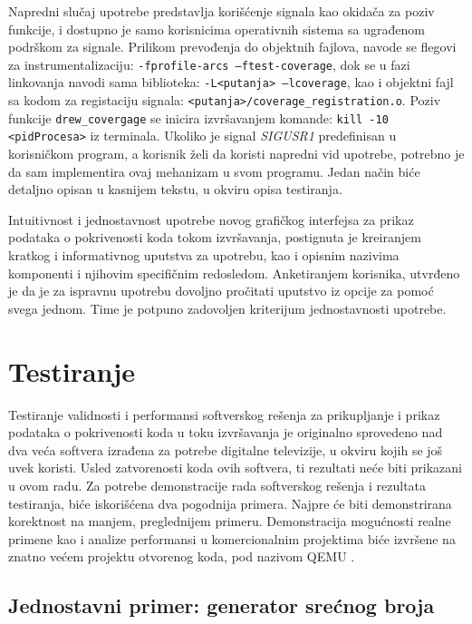 \documentclass[12pt,oneside]{memoir}
\newcommand{\kod}[1]{\texttt{#1}}
\newcommand{\strano}[1]{\textit{#1}}
\begin{document}
Napredni slučaj upotrebe predstavlja korišćenje signala kao okidača za poziv funkcije, i dostupno je samo korisnicima operativnih sistema sa ugrađenom podrškom za signale. Prilikom prevođenja do objektnih fajlova, navode se flegovi za instrumentalizaciju: \kod{-fprofile-arcs –ftest-coverage}, dok se u fazi linkovanja navodi sama biblioteka: \kod{-L<putanja> –lcoverage}, kao i objektni fajl sa kodom za registaciju signala: \kod{<putanja>/coverage\_registration.o}. Poziv funkcije \kod{drew\_covergage} se inicira izvršavanjem komande: \kod{kill -10 <pidProcesa>} iz terminala. Ukoliko je signal \strano{SIGUSR1} predefinisan u korisničkom program, a korisnik želi da koristi napredni vid upotrebe, potrebno je da sam implementira ovaj mehanizam u svom programu. Jedan način biće detaljno opisan u kasnijem tekstu, u okviru opisa testiranja. 

Intuitivnost i jednostavnost upotrebe novog grafičkog interfejsa za prikaz podataka o pokrivenosti koda tokom izvršavanja, postignuta je kreiranjem kratkog i informativnog uputstva za upotrebu, kao i opisnim nazivima komponenti i njihovim specifičnim redosledom. Anketiranjem korisnika, utvrđeno je da je za ispravnu upotrebu dovoljno pročitati uputstvo iz opcije za pomoć svega jednom. Time je potpuno zadovoljen kriterijum jednostavnosti upotrebe. 

\section{Testiranje}

Testiranje validnosti i performansi softverskog rešenja za prikupljanje i prikaz podataka o pokrivenosti koda u toku izvršavanja je originalno sprovedeno nad dva veća softvera izrađena za potrebe digitalne televizije, u okviru kojih se još uvek koristi. Usled zatvorenosti koda ovih softvera, ti rezultati neće biti prikazani u ovom radu. Za potrebe demonstracije rada softverskog rešenja i rezultata testiranja, biće iskorišćena dva pogodnija primera. Najpre će biti demonstrirana korektnost na manjem, preglednijem primeru. Demonstracija mogućnosti realne primene kao i analize performansi u komercionalnim projektima biće izvršene na znatno većem projektu otvorenog koda, pod nazivom QEMU \cite{QEMU}. 
\\

\subsection{Jednostavni primer: generator srećnog broja}
\label{section:lucky}
\end{document}
